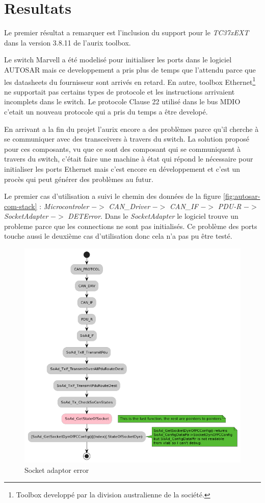 \section{Resultats}

Le premier résultat a remarquer est l'inclusion du support pour le \textit{TC37xEXT} dans la version 3.8.11 de l'aurix toolbox.


Le switch Marvell a \'et\'e modelis\'e pour initialiser les ports dans le logiciel AUTOSAR mais ce developpement a pris plus de temps que l'attendu parce que les datasheets du fournisseur sont arriv\'es en retard. En autre, toolbox Ethernet\footnote{Toolbox developp\'e par la division australienne de la soci\'et\'e.} ne supportait pas certains types de protocole et les instructions arrivaient incomplets dans le switch. Le protocole Clause 22 utilis\'e dans le bus MDIO c'etait un nouveau protocole qui a pris du temps a \^etre develop\'e. 

En arrivant a la fin du projet l'aurix encore a des probl\`emes parce qu'il cherche \`a se communiquer avec des transceivers \`a travers du switch. La solution propos\'e pour ces composants, vu que ce sont des composant qui se communiquent \`a travers du switch, c'était faire une machine \`a \'etat qui répond le nécessaire pour initialiser les ports Ethernet mais c'est encore en développement et c'est un procès qui peut générer des problèmes au futur.

Le premier cas d'utilisation a suivi le chemin des donn\'ees de la figure \ref{fig:autosar-com-stack} : \textit{Microcontroler} $->$ \textit{CAN\_Driver} $->$ \textit{CAN\_IF} $->$ \textit{PDU-R} $->$ \textit{SocketAdapter}\cite{sock_adp_man} $->$ \textit{DETError}\cite{det_man}. Dans le \textit{SocketAdapter} le logiciel trouve un probleme parce que les connections ne sont pas initialis\'es. Ce probl\`eme des ports touche aussi le deuxième cas d'utilisation donc cela n'a pas pu \^etre test\'e.

\begin{figure}[!htb]
 \centering
 \includegraphics[width=\textwidth]{img/SoAd_Error.png}
 \caption{Socket adaptor error}
 \label{fig:soad-error}
\end{figure}
